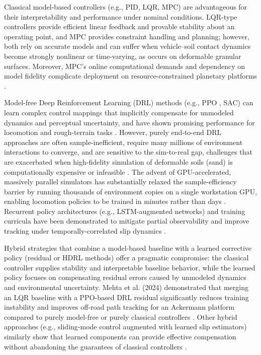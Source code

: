 \documentclass[conference]{IEEEtran}
\begin{document}
Classical model-based controllers (e.g., PID, LQR, MPC) are advantageous for their interpretability and performance under nominal conditions. LQR-type controllers provide efficient linear feedback and provable stability about an operating point, and MPC provides constraint handling and planning; however, both rely on accurate models and can suffer when vehicle--soil contact dynamics become strongly nonlinear or time-varying, as occurs on deformable granular surfaces. Moreover, MPC's online computational demands and dependency on model fidelity complicate deployment on resource-constrained planetary platforms \cite{zhang2023energy, mehta2024hybrid}.

Model-free Deep Reinforcement Learning (DRL) methods (e.g., PPO \cite{schulman2017proximal}, SAC) can learn complex control mappings that implicitly compensate for unmodeled dynamics and perceptual uncertainty, and have shown promising performance for locomotion and rough-terrain tasks \cite{wiberg2021rough, gunma2024sac, lee2020learning}. However, purely end-to-end DRL approaches are often sample-inefficient, require many millions of environment interactions to converge, and are sensitive to the sim-to-real gap, challenges that are exacerbated when high-fidelity simulation of deformable soils (sand) is computationally expensive or infeasible \cite{blum2020ppmc, mortensen2023teacher}. The advent of GPU-accelerated, massively parallel simulators has substantially relaxed the sample-efficiency barrier by running thousands of environment copies on a single workstation GPU, enabling locomotion policies to be trained in minutes rather than days \cite{makoviychuk2021isaac, rudin2022learning, mittal2023orbit}. Recurrent policy architectures (e.g., LSTM-augmented networks) and training curricula have been demonstrated to mitigate partial observability and improve tracking under temporally-correlated slip dynamics \cite{alcayaga2025lstm}.

Hybrid strategies that combine a model-based baseline with a learned corrective policy (residual or HDRL methods) offer a pragmatic compromise: the classical controller supplies stability and interpretable baseline behavior, while the learned policy focuses on compensating residual errors caused by unmodeled dynamics and environmental uncertainty. Mehta et al. (2024) demonstrated that merging an LQR baseline with a PPO-based DRL residual significantly reduces training instability and improves off-road path tracking for an Ackermann platform compared to purely model-free or purely classical controllers \cite{mehta2024hybrid}. Other hybrid approaches (e.g., sliding-mode control augmented with learned slip estimators) similarly show that learned components can provide effective compensation without abandoning the guarantees of classical controllers \cite{nourizadeh2023sliding}.
\end{document}
